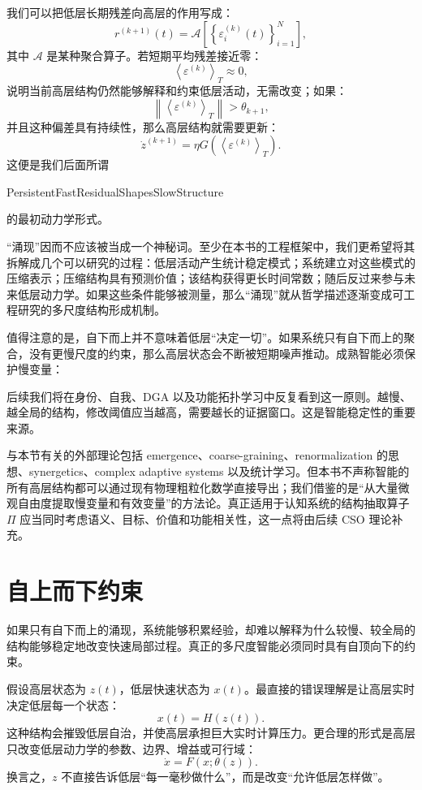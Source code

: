 我们可以把低层长期残差向高层的作用写成：
\[
r^{(k+1)}(t)
=
\mathcal{A}
\left[
\left\{
\varepsilon_i^{(k)}(t)
\right\}_{i=1}^{N}
\right],
\]
其中 $\mathcal{A}$ 是某种聚合算子。若短期平均残差接近零：
\[
\left\langle
\varepsilon^{(k)}
\right\rangle_T
\approx0,
\]
说明当前高层结构仍然能够解释和约束低层活动，无需改变；如果：
\[
\left\|
\left\langle
\varepsilon^{(k)}
\right\rangle_T
\right\|
>
\theta_{k+1},
\]
并且这种偏差具有持续性，那么高层结构就需要更新：
\[
\dot z^{(k+1)}
=
\eta
G
\left(
\left\langle
\varepsilon^{(k)}
\right\rangle_T
\right).
\]
这便是我们后面所谓
\begin{statementbox}
PersistentFastResidualShapesSlowStructure
\end{statementbox}
的最初动力学形式。

“涌现”因而不应该被当成一个神秘词。至少在本书的工程框架中，我们更希望将其拆解成几个可以研究的过程：低层活动产生统计稳定模式；系统建立对这些模式的压缩表示；压缩结构具有预测价值；该结构获得更长时间常数；随后反过来参与未来低层动力学。如果这些条件能够被测量，那么“涌现”就从哲学描述逐渐变成可工程研究的多尺度结构形成机制。

值得注意的是，自下而上并不意味着低层“决定一切”。如果系统只有自下而上的聚合，没有更慢尺度的约束，那么高层状态会不断被短期噪声推动。成熟智能必须保护慢变量：
\begin{statementbox}
\centering
{}
\end{statementbox}
后续我们将在身份、自我、DGA 以及功能拓扑学习中反复看到这一原则。越慢、越全局的结构，修改阈值应当越高，需要越长的证据窗口。这是智能稳定性的重要来源。

与本节有关的外部理论包括 emergence、coarse-graining、renormalization 的思想、synergetics、complex adaptive systems 以及统计学习。但本书不声称智能的所有高层结构都可以通过现有物理粗粒化数学直接导出；我们借鉴的是“从大量微观自由度提取慢变量和有效变量”的方法论。真正适用于认知系统的结构抽取算子 $\Pi$ 应当同时考虑语义、目标、价值和功能相关性，这一点将由后续 CSO 理论补充。

\section{自上而下约束}

如果只有自下而上的涌现，系统能够积累经验，却难以解释为什么较慢、较全局的结构能够稳定地改变快速局部过程。真正的多尺度智能必须同时具有自顶向下的约束。

假设高层状态为 $z(t)$，低层快速状态为 $x(t)$。最直接的错误理解是让高层实时决定低层每一个状态：
\[
x(t)=H(z(t)).
\]
这种结构会摧毁低层自治，并使高层承担巨大实时计算压力。更合理的形式是高层只改变低层动力学的参数、边界、增益或可行域：
\[
\dot x
=
F
\left(
x;
\theta(z)
\right).
\]
换言之，$z$ 不直接告诉低层“每一毫秒做什么”，而是改变“允许低层怎样做”。

